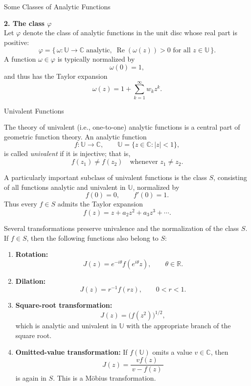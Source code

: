 \documentclass{beamer}
\newcommand{\R}{\mathbb{R}}
\newcommand{\C}{\mathbb{C}}
\newcommand{\U}{\mathbb{U}}
\DeclareMathOperator{\re}{Re}
\begin{document}
	\begin{frame}{Some Classes of Analytic Functions}
		
		\textbf{2. The class $\varphi$}\\[10pt]
		
		Let \(\varphi\) denote the class of analytic functions in the unit disc whose real part is positive:
		\[
		\varphi = \{\, \omega : \U \to \C 
		\;\text{analytic},\; 
		\re(\omega(z)) > 0 \text{ for all } z \in \U \,\}.
		\]
		A function \(\omega \in \varphi\) is typically normalized by
		\[
		\omega(0) = 1,
		\]
		and thus has the Taylor expansion
		\[
		\omega(z) = 1 + \sum_{k=1}^{\infty} w_k z^k.
		\]
	\end{frame}
	
	\begin{frame}{Univalent Functions}
		
		The theory of univalent (i.e., one-to-one) analytic functions is a central part of geometric function theory.  
		An analytic function
		\[
		f : \U \to \C, 
		\qquad 
		\U = \{ z \in \C : |z| < 1 \},
		\]
		is called \emph{univalent} if it is injective; that is,
		\[
		f(z_1) \neq f(z_2) \quad \text{whenever } z_1 \neq z_2.
		\]
		
		A particularly important subclass of univalent functions is the class \(S\), consisting of all functions analytic and univalent in \(\U\), normalized by
		\[
		f(0) = 0, 
		\qquad 
		f'(0) = 1.
		\]
		Thus every \(f \in S\) admits the Taylor expansion
		\[
		f(z) = z + a_2 z^2 + a_3 z^3 + \cdots.
		\]
	\end{frame}
	
	\begin{frame}
		
		Several transformations preserve univalence and the normalization of the class \(S\).  
		If \(f \in S\), then the following functions also belong to \(S\):
		
		\begin{enumerate}
			
			\item \textbf{Rotation:}
			\[
			J(z) = e^{-i\theta} f(e^{i\theta} z),
			\qquad \theta \in \R.
			\]
			
			\item \textbf{Dilation:}
			\[
			J(z) = r^{-1} f(rz),
			\qquad 
			0 < r < 1.
			\]
			
			\item \textbf{Square-root transformation:}
			\[
			J(z) = \big(f(z^2)\big)^{1/2},
			\]
			which is analytic and univalent in \(\U\) with the appropriate branch of the square root.
			
			\item \textbf{Omitted-value transformation:}  
			If \(f(\U)\) omits a value \(v \in \C\), then
			\[
			J(z) = \frac{v f(z)}{\, v - f(z)\, }
			\]
			is again in \(S\).  
			This is a Möbius transformation.
		\end{enumerate}
	\end{frame}
	
\end{document}
